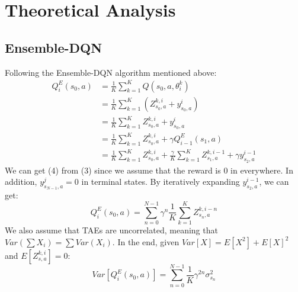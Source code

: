 \section{Theoretical Analysis}
\label{section:analysis}

\subsection{Ensemble-DQN}
Following the Ensemble-DQN algorithm mentioned above:
\begin{align}
Q^E_i(s_0,a)&=\frac{1}{K}\sum^K_{k=1}Q(s_0,a,\theta^k_i)\\
            &=\frac{1}{K}\sum^K_{k=1}(Z^{k,i}_{s_{0},a}+y^i_{s_{0},a})\\
            &=\frac{1}{K}\sum^K_{k=1}Z^{k,i}_{s_{0},a}+y^i_{s_{0},a}\\
            &=\frac{1}{K}\sum^K_{k=1}Z^{k,i}_{s_{0},a}+\gamma Q^E_{i-1}(s_1,a)\\
            &=\frac{1}{K}\sum^K_{k=1}Z^{k,i}_{s_{0},a}+\frac{\gamma}{K}\sum^K_{k=1}Z^{k,i-1}_{s_{1},a}+\gamma y^{i-1}_{s_{2},a}
\end{align}
We can get (4) from (3) since we assume that the reward is 0 in everywhere. In addition, \begin{math}y^{j}_{s_{N-1},a}=0\end{math} in terminal states. By iteratively expanding \begin{math}y^{i-1}_{s_{2},a}\end{math}, we can get:
\[
Q^E_i(s_0,a)=\sum^{N-1}_{n=0}\gamma ^n\frac{1}{K}\sum^K_{k=1}Z^{k,i-n}_{s_{n},a}
\]
We also assume that TAEs are uncorrelated, meaning that \begin{math}Var(\sum X_i)=\sum Var(X_i)\end{math}. In the end, given \begin{math}Var[X]=E[X^{2}]+E[X]^2\end{math} and \begin{math}E[Z^{k,i}_{s,a}]=0\end{math}:
\[
Var[Q^E_{i}(s_{0},a)]=\sum^{N-1}_{n=0}\frac{1}{K}\gamma ^{2n}\sigma^2_{s_n}
\]
